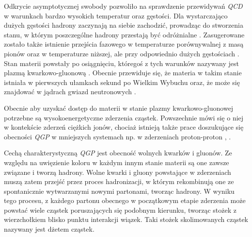 Odkrycie asymptotycznej swobody pozwoliło na sprawdzenie przewidywań \textit{QCD} w warunkach bardzo wysokich temperatur oraz gęstości. 
Dla wystarczająco dużych gęstości hadrony zaczynają na siebie zachodzić, prowadząc do stworzenia stanu, w którym poszczególne hadrony przestają być odróżnialne \cite{Collins:1974ky}. 
Zasugerowane zostało także istnienie przejścia fazowego w temperaturze porównywalnej z masą pionów oraz w temperaturze niższej, ale przy odpowiednio dużych gęstościach \cite{Cabibbo:1975ig}. Stan materii powstały po osiągnięciu, któregoś z tych warunków nazywany jest plazmą kwarkowo-gluonową .
Obecnie przewiduje się, że materia w takim stanie istniała w pierwszych ułamkach sekund po Wielkim Wybuchu \cite{Boyanovsky:2006bf} oraz, że może się znajdować w jądrach gwiazd neutronowych \cite{Alford:2013pma}.

Obecnie aby uzyskać dostęp do materii w stanie plazmy kwarkowo-gluonowej potrzebne są wysokoenergetyczne zderzenia cząstek. Powszechnie mówi się o niej w kontekście zderzeń ciężkich jonów, chociaż istnieją także prace doszukujące się obecności \textit{QGP} w mniejszych systemach np. w zderzeniach proton-proton \cite{Khachatryan:2016txc}, \cite{ALICE:2017jyt}. 

Cechą charakterystyczną \textit{QGP} jest obecność wolnych kwarków i gluonów. Ze względu na uwięzienie koloru w każdym innym stanie materii są one zawsze związane i tworzą hadrony. 
Wolne kwarki i gluony powstające w zderzeniach muszą zatem przejść przez proces hadronizacji, w którym  rekombinują one ze spontanicznie wytwarzanymi nowymi partonami, tworząc hadrony. W wyniku tego procesu, z każdego partonu obecnego w początkowym etapie zderzenia może powstać wiele cząstek poruszających się podobnym kierunku, tworząc stożek z wierzchołkiem blisko punktu interakcji wiązek. Taki stożek skolimowanych cząstek nazywany jest dżetem cząstek.




